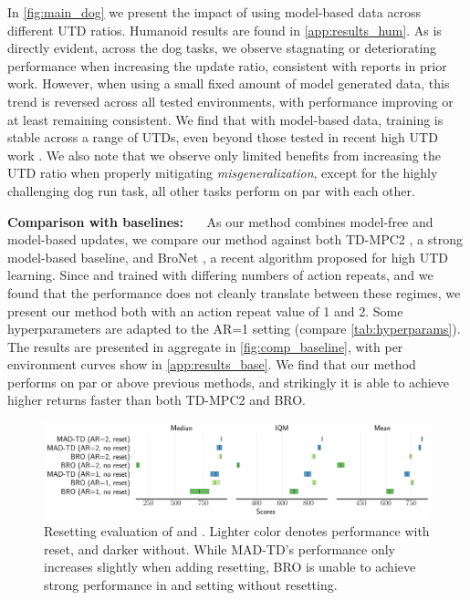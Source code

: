 In \autoref{fig:main_dog} we present the impact of using model-based data across different UTD ratios.
Humanoid results are found in \autoref{app:results_hum}.
As is directly evident, across the dog tasks, we observe stagnating or deteriorating performance when increasing the update ratio, consistent with reports in prior work.
However, when using a small fixed amount of model generated data, this trend is reversed across all tested environments, with performance improving or at least remaining consistent.
We find that with model-based data, training is stable across a range of UTDs, even beyond those tested in recent high UTD work \parencite{nauman2024bigger}.
We also note that we observe only limited benefits from increasing the UTD ratio when properly mitigating \emph{misgeneralization}, except for the highly challenging dog run task, all other tasks perform on par with each other.

\textbf{Comparison with baselines:}~~~
As our method combines model-free and model-based updates, we compare our method against both TD-MPC2 \parencite{hansen2024tdmpc}, a strong model-based baseline, and BroNet \parencite{nauman2024bigger}, a recent algorithm proposed for high UTD learning.
Since \textcite{nauman2024bigger} and \textcite{hansen2024tdmpc} trained with differing numbers of action repeats, and we found that the performance does not cleanly translate between these regimes, we present our method both with an action repeat value of 1 and 2.
Some hyperparameters are adapted to the AR=1 setting (compare \autoref{tab:hyperparams}).
The results are presented in aggregate in \autoref{fig:comp_baseline}, with per environment curves show in \autoref{app:results_base}.
We find that our method performs on par or above previous methods, and strikingly it is able to achieve higher returns faster than both TD-MPC2 and BRO.

\begin{figure}[t]
    \centering
    \includegraphics[width=1.\linewidth]{figures/mad-td/reset_rliable_comp.pdf}
    \caption{Resetting evaluation of  and . Lighter color denotes performance with reset, and darker without. While MAD-TD's performance only increases slightly when adding resetting, BRO is unable to achieve strong performance in and setting without resetting.}
    \label{fig:comp_reset}
\end{figure}

